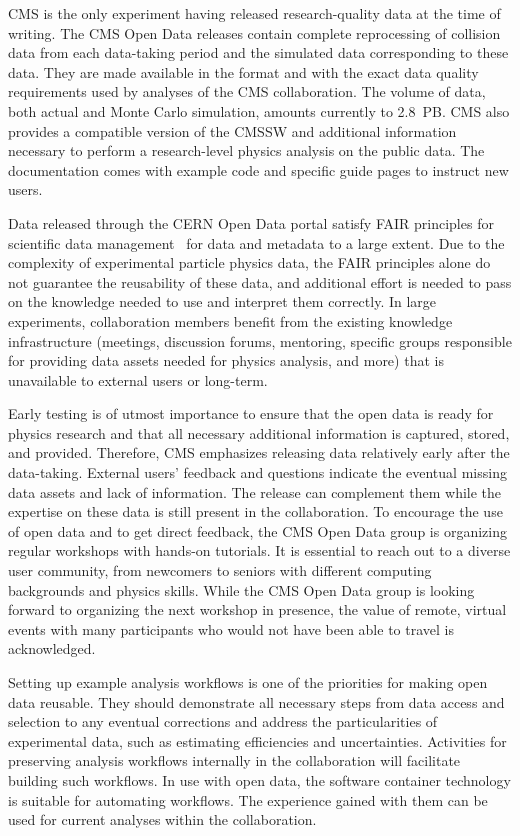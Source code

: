 \documentclass[11pt]{article}
\begin{document}
\gls{CMS} is the only experiment having released research-quality data at the time of writing. The \gls{CMS} Open Data releases contain complete reprocessing of collision data from each data-taking period and the simulated data corresponding to these data. They are made available in the format and with the exact data quality requirements used by analyses of the \gls{CMS} collaboration. The volume of data, both actual and Monte Carlo simulation, amounts currently to 2.8~PB. \gls{CMS} also provides a compatible version of the \gls{CMSSW} and additional information necessary to perform a research-level physics analysis on the public data. The documentation comes with example code and specific guide pages to instruct new users.

Data released through the \gls{CERN} Open Data portal satisfy \gls{FAIR} principles for scientific data management~\cite{FAIR-paper} for data and metadata to a large extent. Due to the complexity of experimental particle physics data, the \gls{FAIR} principles alone do not guarantee the reusability of these data, and additional effort is needed to pass on the knowledge needed to use and interpret them correctly. In large experiments, collaboration members benefit from the existing knowledge infrastructure (meetings, discussion forums, mentoring, specific groups responsible for providing data assets needed for physics analysis, and more) that is unavailable to external users or long-term. 

Early testing is of utmost importance to ensure that the open data is ready for physics research and that all necessary additional information is captured, stored, and provided. Therefore, \gls{CMS} emphasizes releasing data relatively early after the data-taking. External users' feedback and questions indicate the eventual missing data assets and lack of information. The release can complement them while the expertise on these data is still present in the collaboration. To encourage the use of open data and to get direct feedback, the \gls{CMS} Open Data group is organizing regular workshops with hands-on tutorials. It is essential to reach out to a diverse user community, from newcomers to seniors with different computing backgrounds and physics skills. While the \gls{CMS} Open Data group is looking forward to organizing the next workshop in presence, the value of remote, virtual events with many participants who would not have been able to travel is acknowledged.

Setting up example analysis workflows is one of the priorities for making open data reusable. They should demonstrate all necessary steps from data access and selection to any eventual corrections and address the particularities of experimental data, such as estimating efficiencies and uncertainties. Activities for preserving analysis workflows internally in the collaboration will facilitate building such workflows. In use with open data, the software container technology is suitable for automating workflows. The experience gained with them can be used for current analyses within the collaboration.
\end{document}
